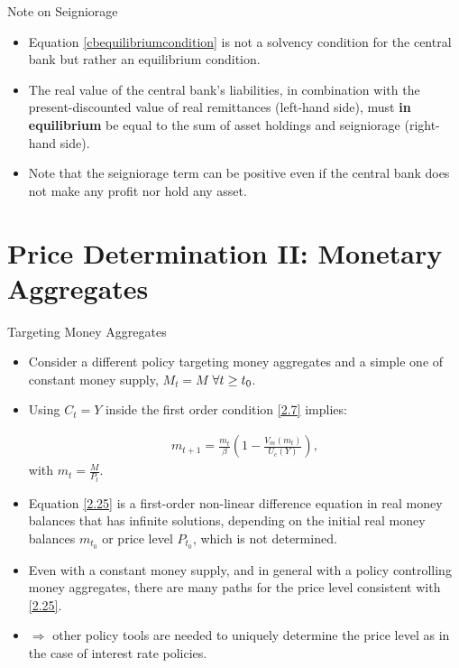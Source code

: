 \documentclass[11pt,aspectratio=169]{beamer}
\begin{document}
\begin{frame}{Note on Seigniorage}

\begin{itemize}
    \item Equation \eqref{cbequilibriumcondition} is not a solvency condition for the central bank but rather an equilibrium condition. 
    \vspace{0.3em}
    \item The real value of the central bank’s liabilities, in combination with the present-discounted value of real remittances (left-hand side), must \textbf{in equilibrium} be equal to the sum of asset holdings and seigniorage (right-hand side). 
    \vspace{0.3em}
    \item Note that the seigniorage term can be positive even if the central bank does not make any profit nor hold any asset. 
\end{itemize}
\end{frame}

\section{Price Determination II: Monetary Aggregates}

\begin{frame}{Targeting Money Aggregates}
\small

\begin{itemize}
\item Consider a different policy targeting money aggregates and a simple one of constant money supply, $M_{t} = M$ $\space \forall \space t \ge t_0$. 
\vspace{0.2em}
\item Using $C_t = Y$ inside the first order condition \eqref{2.7} implies: 

\begin{align}
m_{t+1}=\frac{m_t}{\beta}\left(1-\frac{V_m(m_t)}{U_c(Y)}\right), \label{2.25}
\end{align} with $m_t=\frac{M}{P_t}$.
\item Equation \eqref{2.25} is a first-order non-linear difference  equation in real money balances that has infinite solutions, depending on the initial real money balances $m_{t_0}$ or price level $P_{t_0}$, which is not determined. 
\item Even with a constant money supply, and in general with a policy controlling money aggregates, there are many paths for the price level consistent with \eqref{2.25}.
\item $\Rightarrow$ other policy tools are needed to uniquely determine the price level as in the case of interest rate policies. 
\end{itemize}

\end{frame}
\end{document}
